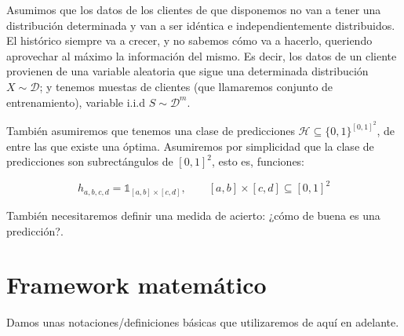 Asumimos que los datos de los clientes de que disponemos no van a tener una distribución determinada y
van a ser idéntica e independientemente distribuidos. El histórico siempre va a crecer, y no sabemos cómo va a hacerlo, queriendo aprovechar
al máximo la información del mismo. Es decir, los datos de un cliente provienen de una variable aleatoria que sigue una determinada
distribución $X \sim \mathcal{D}$; y tenemos muestas de clientes (que llamaremos conjunto de entrenamiento), variable i.i.d
$S \sim \mathcal{D}^m$. 

También asumiremos que tenemos una clase de predicciones $\mathcal{H} \subseteq \{0,1\}^{[0,1]^2}$, de entre las que existe
una óptima. Asumiremos por simplicidad que la clase de predicciones son subrectángulos de $[0,1]^2$, esto es, funciones:

\[h_{a,b,c,d} = \mathds{1}_{[a,b]\times[c,d]}, \qquad [a,b]\times [c,d] \subseteq [0,1]^2\]


También necesitaremos definir una medida de acierto: ¿cómo de buena es una predicción?.

\section{Framework matemático}

Damos unas notaciones/definiciones básicas que utilizaremos de aquí en adelante.

